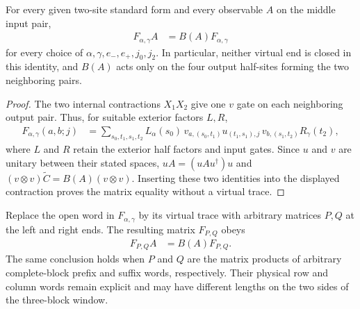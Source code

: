 \begin{lemma}
    \label{lem:mpu_two_site_open_three_block_locality}
    \leanok
    For every given two-site standard form and every observable $A$ on
    the middle input pair,
    \begin{align}
        F_{\alpha,\gamma}A & =B(A)F_{\alpha,\gamma}
    \end{align}
    for every choice of $\alpha,\gamma,e_-,e_+,j_0,j_2$. In particular,
    neither virtual end is closed in this identity, and $B(A)$ acts only on
    the four output half-sites forming the two neighboring pairs.
\end{lemma}

\begin{proof}\leanok
    The two internal contractions $X_1X_2$ give one $v$ gate on each
    neighboring output pair. Thus, for suitable exterior factors $L,R$,
    \begin{align}
        F_{\alpha,\gamma}(a,b;j)
         & =\sum_{s_0,t_1,s_1,t_2}
        L_{\alpha}(s_0)\,v_{a,(s_0,t_1)}
        u_{(t_1,s_1),j}\,v_{b,(s_1,t_2)}R_{\gamma}(t_2),
    \end{align}
    where $L$ and $R$ retain the exterior half factors and input gates.
    Since $u$ and $v$ are unitary between their stated spaces,
    $uA=(uAu^{\dagger})u$ and
    $(v\otimes v)\widetilde C=B(A)(v\otimes v)$.
    Inserting these two identities into the displayed contraction proves
    the matrix equality without a virtual trace.
\end{proof}

\begin{lemma}
    \label{lem:mpu_two_site_open_three_block_buffers}
    \leanok
    Replace the open word in $F_{\alpha,\gamma}$ by its virtual trace with
    arbitrary matrices $P,Q$ at the left and right ends. The resulting
    matrix $F_{P,Q}$ obeys
    \begin{align}
        F_{P,Q}A & =B(A)F_{P,Q}.
    \end{align}
    The same conclusion holds when $P$ and $Q$ are the matrix products of
    arbitrary complete-block prefix and suffix words, respectively. Their
    physical row and column words remain explicit and may have different
    lengths on the two sides of the three-block window.
\end{lemma}

